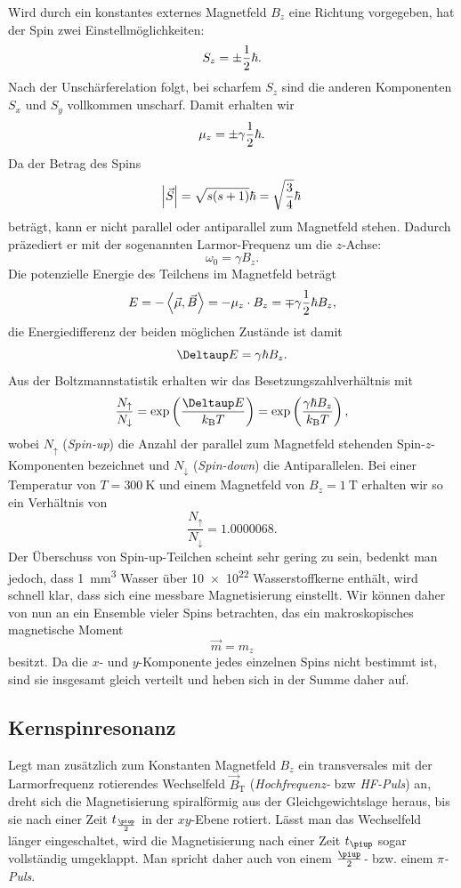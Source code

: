 \documentclass[
    11pt,
    ngerman
]{scrbook}
\begin{document}
Wird durch ein konstantes externes Magnetfeld $B_z$ eine Richtung vorgegeben,
hat der Spin zwei Einstellmöglichkeiten:
\[
    S_z = \pm\frac 12\hbar.
\]
Nach der Unschärferelation folgt, bei scharfem $S_z$ sind die anderen
Komponenten $S_x$ und $S_y$ vollkommen unscharf. Damit erhalten wir
\[
    \mu_z = \pm\gamma\frac 12\hbar.
\]
Da der Betrag des Spins 
\[
    \abs{\vec S} = \sqrt{s(s+1)}\hbar = \sqrt{\frac34}\hbar
\]
beträgt, kann er nicht parallel oder antiparallel zum Magnetfeld stehen.
Dadurch präzediert er mit der sogenannten Larmor-Frequenz um die $z$-Achse:
\[
    \omega_0 = \gamma B_z.
\]
Die potenzielle Energie des Teilchens im Magnetfeld beträgt
\[
    E = -\left\langle\vec\mu,\vec B\right\rangle = -\mu_z \cdot B_z = \mp\gamma\frac 12\hbar B_z,
\]
die Energiedifferenz der beiden möglichen Zustände ist damit
\[
    \Deltaup E = \gamma\hbar B_z.
\]
Aus der Boltzmannstatistik erhalten wir das Besetzungszahlverhältnis mit
\[
    \frac{N_\uparrow}{N_\downarrow} = \dexp{\frac{\Deltaup E}{k_\text{B}T}} =
    \dexp{\frac{\gamma\hbar B_z}{k_\text{B}T}},
\]
wobei $N_\uparrow$ (\emph{Spin-up}) die Anzahl der parallel zum Magnetfeld
stehenden Spin-$z$-Komponenten bezeichnet und $N_\downarrow$ (\emph{Spin-down})
die Antiparallelen. Bei einer Temperatur von $T = \SI{300}{\kelvin}$ und einem
Magnetfeld von $B_z = \SI{1}{\tesla}$ erhalten wir so ein Verhältnis von
\[
    \frac{N_\uparrow}{N_\downarrow} = \num{1.0000068}.
\]
Der Überschuss von Spin-up-Teilchen scheint sehr gering zu sein, bedenkt man
jedoch, dass \SI{1}{\milli\meter\cubed} Wasser über \num{10e22} Wasserstoffkerne
enthält, wird schnell klar, dass sich eine messbare Magnetisierung einstellt.
Wir können daher von nun an ein Ensemble vieler Spins betrachten, das ein
makroskopisches magnetische Moment
\[
    \vec m = m_z
\]
besitzt. Da die $x$- und $y$-Komponente jedes einzelnen Spins nicht bestimmt ist, sind sie insgesamt gleich verteilt und heben sich in der Summe daher auf.

\subsection{Kernspinresonanz}

Legt man zusätzlich zum Konstanten Magnetfeld $B_z$ ein transversales mit der
Larmorfrequenz rotierendes Wechselfeld $\vec B_\text{T}$ (\emph{Hochfrequenz-}
bzw \emph{HF-Puls}) an, dreht sich die Magnetisierung spiralförmig aus der
Gleichgewichtslage heraus, bis sie nach einer Zeit $t_{\frac\piup2}$ in der
$xy$-Ebene rotiert. Lässt man das Wechselfeld länger eingeschaltet, wird die
Magnetisierung nach einer Zeit $t_{\piup}$ sogar vollständig umgeklappt. Man
spricht daher auch von einem \emph{$\frac\piup2$-} bzw. einem
\emph{$\pi$-Puls}.
\end{document}
